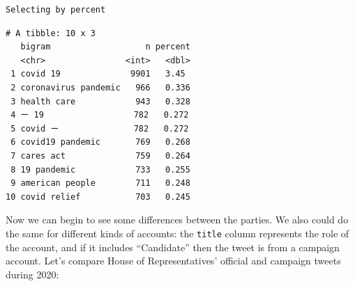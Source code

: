 \documentclass[
  letterpaper,
  DIV=11,
  numbers=noendperiod]{scrreprt}
\newenvironment{Shaded}{\begin{snugshade}}{\end{snugshade}}
\newcommand{\AttributeTok}[1]{\textcolor[rgb]{0.40,0.45,0.13}{#1}}
\newcommand{\ConstantTok}[1]{\textcolor[rgb]{0.56,0.35,0.01}{#1}}
\newcommand{\DecValTok}[1]{\textcolor[rgb]{0.68,0.00,0.00}{#1}}
\newcommand{\FunctionTok}[1]{\textcolor[rgb]{0.28,0.35,0.67}{#1}}
\newcommand{\NormalTok}[1]{\textcolor[rgb]{0.00,0.23,0.31}{#1}}
\newcommand{\SpecialCharTok}[1]{\textcolor[rgb]{0.37,0.37,0.37}{#1}}
\newcommand{\StringTok}[1]{\textcolor[rgb]{0.13,0.47,0.30}{#1}}
\begin{document}
\begin{verbatim}
Selecting by percent
\end{verbatim}

\begin{verbatim}
# A tibble: 10 x 3
   bigram                   n percent
   <chr>                <int>   <dbl>
 1 covid 19              9901   3.45 
 2 coronavirus pandemic   966   0.336
 3 health care            943   0.328
 4 ー 19                  782   0.272
 5 covid ー               782   0.272
 6 covid19 pandemic       769   0.268
 7 cares act              759   0.264
 8 19 pandemic            733   0.255
 9 american people        711   0.248
10 covid relief           703   0.245
\end{verbatim}

Now we can begin to see some differences between the parties. We also
could do the same for different kinds of accounts: the \texttt{title}
column represents the role of the account, and if it includes
``Candidate'' then the tweet is from a campaign account. Let's compare
House of Representatives' official and campaign tweets during 2020:

\begin{Shaded}
\end{Shaded}
\end{document}
